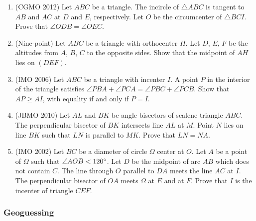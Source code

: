 \documentclass[11pt,paper=letter]{scrartcl}
\begin{document}
\begin{enumerate}
  \item (CGMO 2012) Let $ABC$ be a triangle. The incircle of $\triangle ABC$ is tangent to $AB$ and $AC$ at $D$ and $E$, respectively. Let $O$ be the circumcenter of $\triangle BCI$. Prove that $\angle ODB = \angle OEC$. %

  \item (Nine-point) Let $ABC$ be a triangle with orthocenter $H$. Let $D$, $E$, $F$ be the altitudes from $A$, $B$, $C$ to the opposite sides. Show that the midpoint of $AH$ lies on $(DEF)$.

  \item (IMO 2006) Let $ABC$ be a triangle with incenter $I$. A point $P$ in the interior of the triangle satisfies $\angle PBA + \angle PCA = \angle PBC + \angle PCB$. Show that $AP \geq AI$, with equality if and only if $P = I$. %

  \item (JBMO 2010) Let $AL$ and $BK$ be angle bisectors of scalene triangle $ABC$. The perpendicular bisector of $BK$ intersects line $AL$ at $M$. Point $N$ lies on line $BK$ such that $LN$ is parallel to $MK$. Prove that $LN = NA$. %

  \item (IMO 2002) Let $BC$ be a diameter of circle $\Omega$ center at $O$. Let $A$ be a point of $\Omega$ such that $\angle AOB < 120^\circ$. Let $D$ be the midpoint of arc $AB$ which does not contain $C$. The line through $O$ parallel to $DA$ meets the line $AC$ at $I$. The perpendicular bisector of $OA$ meets $\Omega$ at $E$ and at $F$. Prove that $I$ is the incenter of triangle $CEF$. %
\end{enumerate}

\subsubsection*{Geoguessing}
\end{document}
